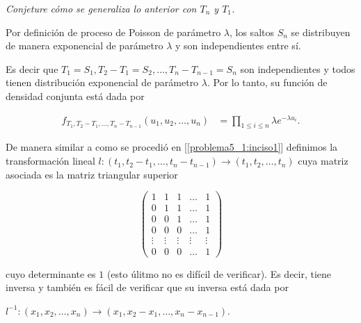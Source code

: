 \emph{
	Conjeture c\'omo se  generaliza lo anterior con $T_n$ y $T_1$.
}

Por definición de proceso de Poisson de parámetro $\lambda$, los saltos $S_n$ se distribuyen
de manera exponencial de parámetro $\lambda$ y son independientes entre sí.\pn

Es decir que $T_1 = S_1, T_2 - T_1 = S_2, \dots, T_n - T_{n-1} = S_n$ son independientes y 
todos tienen distribución exponencial de parámetro $\lambda$. Por lo tanto, su función
de densidad conjunta está dada por

\begin{align}
    f_{T_1, T_2 - T_1, \dots, T_n - T_{n-1}}(u_1, u_2, \dots, u_n)  &=  \prod_{1 \leq i \leq n} \lambda e^{-\lambda u_i}.
\end{align}

De manera similar a como se procedió en [\ref{problema5_1:inciso1}] definimos la transformación lineal 
$l: (t_1, t_2 - t_1, \dots, t_n - t_{n-1}) \longrightarrow (t_1, t_2, \dots, t_n)$ cuya matriz asociada es la 
matriz triangular superior

\[
    \left(
            \begin{array}{ccccc}
                    1       &   1       & 1      &\dots   &  1      \\
                    0       &   1       & 1      &\dots   &  1      \\
                    0       &   0       & 1      &\dots   &  1      \\
                    0       &   0       & 0      &\dots   &  1      \\
                    \vdots  &   \vdots  & \vdots &\vdots  & \vdots  \\
                    0       &   0       & 0      &\dots   &  1
            \end{array}
    \right)
\]\pn

cuyo determinante es $1$ (esto úlitmo no es difícil de verificar). Es decir, tiene inversa y también es fácil de verificar que 
su inversa está dada por\par $l^{-1}: (x_1, x_2, \dots, x_n) \longrightarrow (x_1, x_2-x_1, \dots, x_n - x_{n-1})$.

